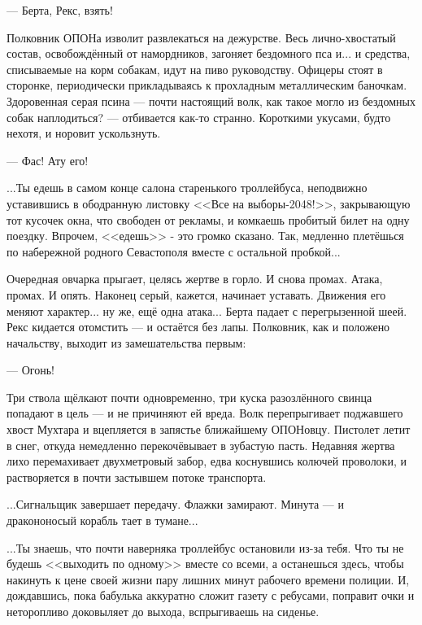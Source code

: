 --- Берта, Рекс, взять!

Полковник ОПОНа изволит развлекаться на дежурстве.
Весь лично-хвостатый состав, освобождённый от намордников, загоняет бездомного пса и...
и средства, списываемые на корм собакам, идут на пиво руководству.
Офицеры стоят в сторонке, периодически прикладываясь к прохладным металлическим баночкам.
Здоровенная серая псина --- почти настоящий волк, как такое могло из бездомных собак наплодиться? ---
отбивается как-то странно. Короткими укусами, будто нехотя, и норовит ускользнуть.

--- Фас! Ату его!

\emptypar

...Ты едешь в самом конце салона старенького троллейбуса,
неподвижно уставившись в ободранную листовку <<Все на выборы-2048!>>, закрывающую тот кусочек окна, что свободен от рекламы,
и комкаешь пробитый билет на одну поездку. Впрочем, <<едешь>> - это громко сказано.
Так, медленно плетёшься по набережной родного Севастополя вместе с остальной пробкой...

\emptypar

Очередная овчарка прыгает, целясь жертве в горло. И снова промах. Атака, промах. И опять.
Наконец серый, кажется, начинает уставать. Движения его меняют характер... ну же, ещё одна атака...
Берта падает с перегрызенной шеей. Рекс кидается отомстить --- и остаётся без лапы.
Полковник, как и положено начальству, выходит из замешательства первым:

--- Огонь!

Три ствола щёлкают почти одновременно, три куска разозлённого свинца попадают в цель --- и не причиняют ей вреда.
Волк перепрыгивает поджавшего хвост Мухтара и вцепляется в запястье ближайшему ОПОНовцу.
Пистолет летит в снег, откуда немедленно перекочёвывает в зубастую пасть.
Недавняя жертва лихо перемахивает двухметровый забор, едва коснувшись колючей проволоки,
и растворяется в почти застывшем потоке транспорта.

\emptypar

...Сигнальщик завершает передачу. Флажки замирают. Минута --- и дракононосый корабль тает в тумане...

\emptypar

...Ты знаешь, что почти наверняка троллейбус остановили из-за тебя.
Что ты не будешь <<выходить по одному>> вместе со всеми, а останешься здесь,
чтобы накинуть к цене своей жизни пару лишних минут рабочего времени полиции.
И, дождавшись, пока бабулька аккуратно сложит газету с ребусами, поправит очки и неторопливо доковыляет до выхода,
вспрыгиваешь на сиденье.

